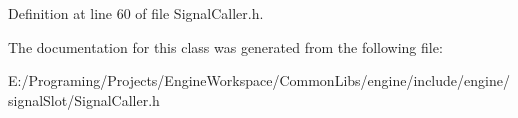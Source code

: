 Definition at line 60 of file Signal\+Caller.\+h.



The documentation for this class was generated from the following file\+:\begin{DoxyCompactItemize}
\item 
E\+:/\+Programing/\+Projects/\+Engine\+Workspace/\+Common\+Libs/engine/include/engine/signal\+Slot/Signal\+Caller.\+h\end{DoxyCompactItemize}
